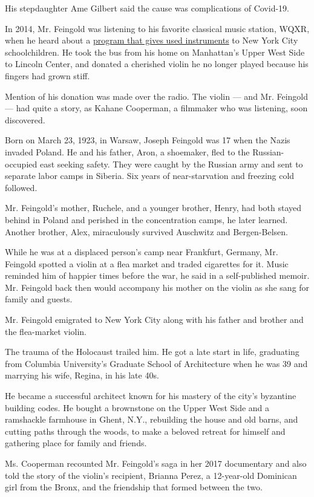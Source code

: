 His stepdaughter Ame Gilbert said the cause was complications of
Covid-19.

In 2014, Mr. Feingold was listening to his favorite classical music
station, WQXR, when he heard about a
\href{https://www.mhopus.org/}{program that gives used instruments} to
New York City schoolchildren. He took the bus from his home on
Manhattan's Upper West Side to Lincoln Center, and donated a cherished
violin he no longer played because his fingers had grown stiff.

Mention of his donation was made over the radio. The violin --- and Mr.
Feingold --- had quite a story, as Kahane Cooperman, a filmmaker who was
listening, soon discovered.

Born on March 23, 1923, in Warsaw, Joseph Feingold was 17 when the Nazis
invaded Poland. He and his father, Aron, a shoemaker, fled to the
Russian-occupied east seeking safety. They were caught by the Russian
army and sent to separate labor camps in Siberia. Six years of
near-starvation and freezing cold followed.

Mr. Feingold's mother, Ruchele, and a younger brother, Henry, had both
stayed behind in Poland and perished in the concentration camps, he
later learned. Another brother, Alex, miraculously survived Auschwitz
and Bergen-Belsen.

While he was at a displaced person's camp near Frankfurt, Germany, Mr.
Feingold spotted a violin at a flea market and traded cigarettes for it.
Music reminded him of happier times before the war, he said in a
self-published memoir. Mr. Feingold back then would accompany his mother
on the violin as she sang for family and guests.

Mr. Feingold emigrated to New York City along with his father and
brother and the flea-market violin.

The trauma of the Holocaust trailed him. He got a late start in life,
graduating from Columbia University's Graduate School of Architecture
when he was 39 and marrying his wife, Regina, in his late 40s.

He became a successful architect known for his mastery of the city's
byzantine building codes. He bought a brownstone on the Upper West Side
and a ramshackle farmhouse in Ghent, N.Y., rebuilding the house and old
barns, and cutting paths through the woods, to make a beloved retreat
for himself and gathering place for family and friends.

Ms. Cooperman recounted Mr. Feingold's saga in her 2017 documentary and
also told the story of the violin's recipient, Brianna Perez, a
12-year-old Dominican girl from the Bronx, and the friendship that
formed between the two.

